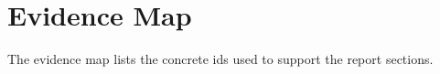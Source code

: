 \section{Evidence Map}
The evidence map lists the concrete ids used to support the report sections.
